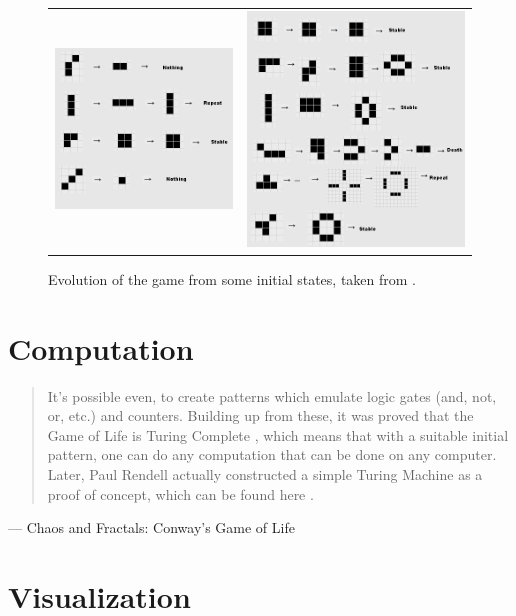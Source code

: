 \documentclass[addpoints]{exam}
\begin{document}
\begin{figure}[!h]
  \centering
  \begin{tabular}{cc}
    \includegraphics[width=.48\textwidth]{pattern1}
     & \includegraphics[width=.48\textwidth]{pattern2}
  \end{tabular}
  \caption{Evolution of the game from some initial states, taken from \cite{chaos}.}
\end{figure}


\section*{Computation}
\begin{quotation}
  It's possible even, to create patterns which emulate logic gates (and, not, or, etc.) and counters. Building up from these, it was proved that the Game of Life is Turing Complete \cite{wp_turing}, which means that with a suitable initial pattern, one can do any computation that can be done on any computer. Later, Paul Rendell actually constructed a simple Turing Machine as a proof of concept, which can be found here \cite{gol_turing}.
\end{quotation}
\raggedleft --- Chaos and Fractals: Conway's Game of Life \cite{chaos}
\justify

\section*{Visualization}
\end{document}
